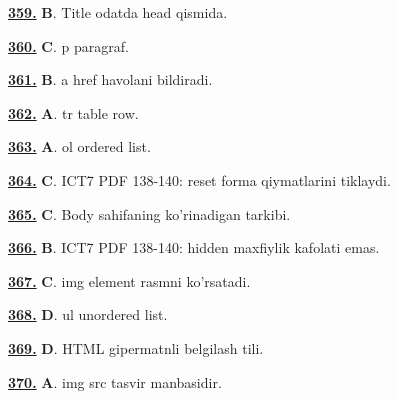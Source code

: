 \documentclass[10pt,a4paper,oneside]{article}
\begin{document}
\par\vspace{3mm}
\noindent\hyperlink{q359}{\textbf{359.}} \textbf{B}.  Title odatda head qismida.
\par\vspace{3mm}
\noindent\hyperlink{q360}{\textbf{360.}} \textbf{C}.  p paragraf.
\par\vspace{3mm}
\noindent\hyperlink{q361}{\textbf{361.}} \textbf{B}.  a href havolani bildiradi.
\par\vspace{3mm}
\noindent\hyperlink{q362}{\textbf{362.}} \textbf{A}.  tr table row.
\par\vspace{3mm}
\noindent\hyperlink{q363}{\textbf{363.}} \textbf{A}.  ol ordered list.
\par\vspace{3mm}
\noindent\hyperlink{q364}{\textbf{364.}} \textbf{C}.  ICT7 PDF 138-140: reset forma qiymatlarini tiklaydi.
\par\vspace{3mm}
\noindent\hyperlink{q365}{\textbf{365.}} \textbf{C}.  Body sahifaning ko'rinadigan tarkibi.
\par\vspace{3mm}
\noindent\hyperlink{q366}{\textbf{366.}} \textbf{B}.  ICT7 PDF 138-140: hidden maxfiylik kafolati emas.
\par\vspace{3mm}
\noindent\hyperlink{q367}{\textbf{367.}} \textbf{C}.  img element rasmni ko'rsatadi.
\par\vspace{3mm}
\noindent\hyperlink{q368}{\textbf{368.}} \textbf{D}.  ul unordered list.
\par\vspace{3mm}
\noindent\hyperlink{q369}{\textbf{369.}} \textbf{D}.  HTML gipermatnli belgilash tili.
\par\vspace{3mm}
\noindent\hyperlink{q370}{\textbf{370.}} \textbf{A}.  img src tasvir manbasidir.
\par\vspace{3mm}
\end{document}
